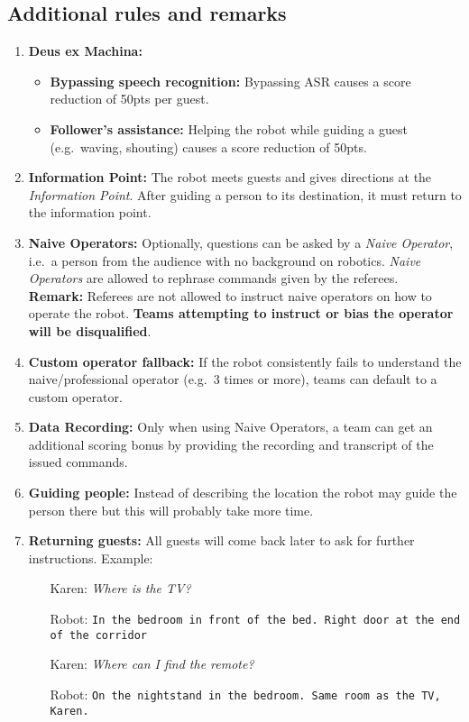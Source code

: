 \subsection*{Additional rules and remarks}
\begin{enumerate}[nosep]
	\item \textbf{Deus ex Machina:}
	\begin{itemize}[nosep]
		\item \textbf{Bypassing speech recognition:} Bypassing ASR causes a score reduction of 50pts per guest.

		\item \textbf{Follower's assistance:} Helping the robot while guiding a guest (e.g.~waving, shouting) causes a score reduction of 50pts.
	\end{itemize}

	\item \textbf{Information Point:} The robot meets guests and gives directions at the \emph{Information Point}.
	After guiding a person to its destination, it must return to the information point.

	\item \textbf{Naive Operators:} Optionally, questions can be asked by a \emph{Naive Operator}, i.e.~a person from the audience with no background on robotics. \emph{Naive Operators} are allowed to rephrase commands given by the referees.
	\\\textbf{Remark:} Referees are not allowed to instruct naive operators on how to operate the robot. \textbf{Teams attempting to instruct or bias the operator will be disqualified}.

	\item \textbf{Custom operator fallback:} If the robot consistently fails to understand the naive/professional operator (e.g.~3 times or more), teams can default to a custom operator.

	\item \textbf{Data Recording:} Only when using Naive Operators, a team can get an additional scoring bonus by providing the recording and transcript of the issued commands.

	\item \textbf{Guiding people:} Instead of describing the location the robot may guide the person there but this will probably take more time.

	\item \textbf{Returning guests:} All guests will come back later to ask for further instructions.
	Example:
	\begin{itemize}[nosep,leftmargin=1.2cm]
		\item[Karen:] \emph{Where is the TV?}
		\item[Robot:] \texttt{\small In the bedroom in front of the bed. Right door at the end of the corridor}
		\item[Karen:] \emph{Where can I find the remote?}
		\item[Robot:] \texttt{\small On the nightstand in the bedroom. Same room as the TV, Karen.}
	\end{itemize}


\end{enumerate}
